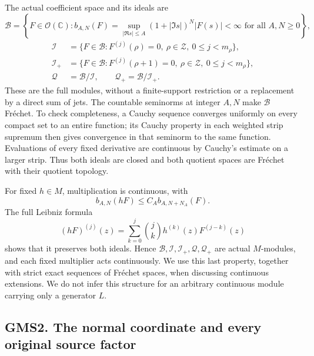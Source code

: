 The actual coefficient space and its ideals are \[
\mathcal B=\left\{F\in\mathcal O(\mathbb C):
b_{A,N}(F)=\sup_{|\Re s|\le A}(1+|\Im s|)^N|F(s)|<\infty
\text{ for all }A,N\ge0\right\},
\] \[
\begin{aligned}
\mathcal I&=\{F\in\mathcal B:F^{(j)}(\rho)=0,
\ \rho\in\mathscr Z,\ 0\le j<m_\rho\},
\\
\mathcal I_+&=\{F\in\mathcal B:F^{(j)}(\rho+1)=0,
\ \rho\in\mathscr Z,\ 0\le j<m_\rho\},
\\
\mathcal Q&=\mathcal B/\mathcal I,\qquad
\mathcal Q_+=\mathcal B/\mathcal I_+.
\end{aligned}
\tag{GMS1.3}
\] These are the full modules, without a finite-support restriction or a
replacement by a direct sum of jets. The countable seminorms at integer
\(A,N\) make \(\mathcal B\) Fréchet. To check completeness, a Cauchy
sequence converges uniformly on every compact set to an entire function;
its Cauchy property in each weighted strip supremum then gives
convergence in that seminorm to the same function. Evaluations of every
fixed derivative are continuous by Cauchy's estimate on a larger strip.
Thus both ideals are closed and both quotient spaces are Fréchet with
their quotient topology.

For fixed \(h\in M\), multiplication is continuous, with \[
b_{A,N}(hF)\le C_A b_{A,N+N_A}(F).
\tag{GMS1.4}
\] The full Leibniz formula \[
(hF)^{(j)}(z)=\sum_{k=0}^j\binom jk h^{(k)}(z)F^{(j-k)}(z)
\tag{GMS1.5}
\] shows that it preserves both ideals. Hence
\(\mathcal B,\mathcal I,\mathcal I_+,\mathcal Q,\mathcal Q_+\) are
actual \(M\)-modules, and each fixed multiplier acts continuously. We
use this last property, together with strict exact sequences of Fréchet
spaces, when discussing continuous extensions. We do not infer this
structure for an arbitrary continuous module carrying only a generator
\(L\).

\subsection{GMS2. The normal coordinate and every original source
factor}\label{gms2.-the-normal-coordinate-and-every-original-source-factor}

